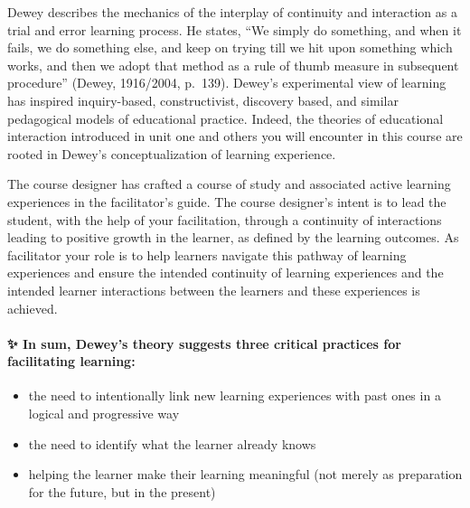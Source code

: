 \documentclass[
]{book}
\providecommand{\tightlist}{%
  \setlength{\itemsep}{0pt}\setlength{\parskip}{0pt}}
\begin{document}
Dewey describes the mechanics of the interplay of continuity and interaction as a trial and error learning process. He states, ``We simply do something, and when it fails, we do something else, and keep on trying till we hit upon something which works, and then we adopt that method as a rule of thumb measure in subsequent procedure'' (Dewey, 1916/2004, p.~139). Dewey's experimental view of learning has inspired inquiry-based, constructivist, discovery based, and similar pedagogical models of educational practice. Indeed, the theories of educational interaction introduced in unit one and others you will encounter in this course are rooted in Dewey's conceptualization of learning experience.

The course designer has crafted a course of study and associated active learning experiences in the facilitator's guide. The course designer's intent is to lead the student, with the help of your facilitation, through a continuity of interactions leading to positive growth in the learner, as defined by the learning outcomes. As facilitator your role is to help learners navigate this pathway of learning experiences and ensure the intended continuity of learning experiences and the intended learner interactions between the learners and these experiences is achieved.

\begin{protip}
\hypertarget{in-sum-deweys-theory-suggests-three-critical-practices-for-facilitating-learning}{%
\paragraph{✨ In sum, Dewey's theory suggests three critical practices
for facilitating
learning:}\label{in-sum-deweys-theory-suggests-three-critical-practices-for-facilitating-learning}}

\begin{itemize}
\tightlist
\item
  the need to intentionally link new learning experiences with past ones
  in a logical and progressive way\\
\item
  the need to identify what the learner already knows\\
\item
  helping the learner make their learning meaningful (not merely as
  preparation for the future, but in the present)
\end{itemize}
\end{protip}
\end{document}
